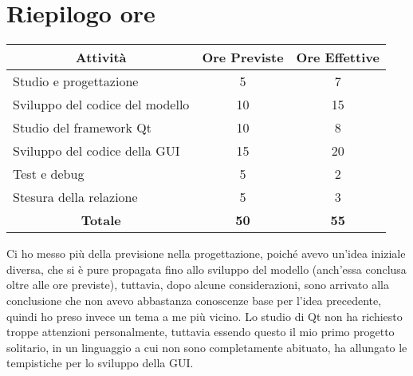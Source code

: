 \documentclass[10pt]{article}
\begin{document}
\newpage

\section{Riepilogo ore}
\begin{center}
\begin{tabular}{|c c c|}
    \hline
    \textbf{Attività} & \textbf{Ore Previste} & \textbf{Ore Effettive} \\
    \hline
    \multicolumn{1}{|l}{Studio e progettazione} & 5 & 7 \\
    \multicolumn{1}{|l}{Sviluppo del codice del modello} & 10 & 15 \\
    \multicolumn{1}{|l}{Studio del framework Qt} & 10 & 8 \\
    \multicolumn{1}{|l}{Sviluppo del codice della GUI} & 15 & 20 \\
    \multicolumn{1}{|l}{Test e debug} & 5 & 2 \\
    \multicolumn{1}{|l}{Stesura della relazione} & 5 & 3 \\
    \hline
    \textbf{Totale} & \textbf{50} & \textbf{55} \\
    \hline
\end{tabular}
\end{center}
Ci ho messo più della previsione nella progettazione, poiché avevo un'idea
iniziale diversa, che si è pure propagata fino allo sviluppo del modello
(anch'essa conclusa oltre alle ore previste),
tuttavia, dopo alcune considerazioni, sono arrivato alla conclusione che non
avevo abbastanza conoscenze base per l'idea precedente, quindi ho preso invece
un tema a me più vicino. Lo studio di Qt non ha richiesto troppe attenzioni
personalmente, tuttavia essendo questo il mio primo progetto solitario, in un
linguaggio a cui non sono completamente abituato, ha allungato le tempistiche
per lo sviluppo della GUI.
\end{document}
